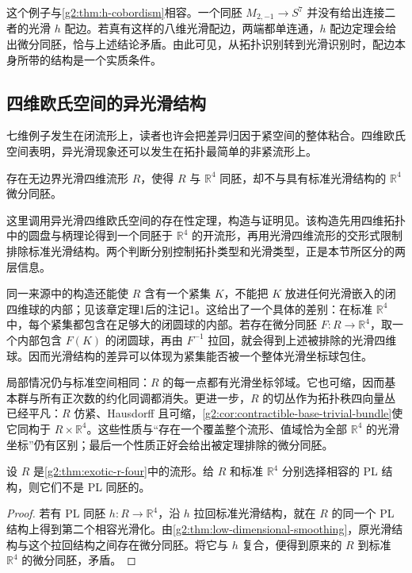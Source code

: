 \ProseParagraphBreak

这个例子与\cref{g2:thm:h-cobordism}相容。一个同胚 \(M_{2,-1}\rightarrow S^7\) 并没有给出连接二者的光滑 \(h\) 配边。若真有这样的八维光滑配边，两端都单连通，\(h\) 配边定理会给出微分同胚，恰与上述结论矛盾。由此可见，从拓扑识别转到光滑识别时，配边本身所带的结构是一个实质条件。

\subsection{四维欧氏空间的异光滑结构}
\label{g2:subsec:2304:04}
七维例子发生在闭流形上，读者也许会把差异归因于紧空间的整体粘合。四维欧氏空间表明，异光滑现象还可以发生在拓扑最简单的非紧流形上。

\begin{theorem}\label{g2:thm:exotic-r-four}
	存在无边界光滑四维流形 \(R\)，使得 \(R\) 与 \(\mathbb R^4\) 同胚，却不与具有标准光滑结构的 \(\mathbb R^4\) 微分同胚。
\end{theorem}

这里调用异光滑四维欧氏空间的存在性定理，构造与证明见\cite[第XIV章，定理1，第95--96页]{Kirby1989TopologyFour}。该构造先用四维拓扑中的圆盘与柄理论得到一个同胚于 \(\mathbb R^4\) 的开流形，再用光滑四维流形的交形式限制排除标准光滑结构。两个判断分别控制拓扑类型和光滑类型，正是本节所区分的两层信息。

\ProseParagraphBreak

同一来源中的构造还能使 \(R\) 含有一个紧集 \(K\)，不能把 \(K\) 放进任何光滑嵌入的闭四维球的内部；见该章定理1后的注记1。这给出了一个具体的差别：在标准 \(\mathbb R^4\) 中，每个紧集都包含在足够大的闭圆球的内部。若存在微分同胚 \(F\colon R\rightarrow\mathbb R^4\)，取一个内部包含 \(F(K)\) 的闭圆球，再由 \(F^{-1}\) 拉回，就会得到上述被排除的光滑四维球。因而光滑结构的差异可以体现为紧集能否被一个整体光滑坐标球包住。

\ProseParagraphBreak

局部情况仍与标准空间相同：\(R\) 的每一点都有光滑坐标邻域。它也可缩，因而基本群与所有正次数的约化同调都消失。更进一步，\(R\) 的切丛作为拓扑秩四向量丛已经平凡：\(R\) 仿紧、Hausdorff 且可缩，\cref{g2:cor:contractible-base-trivial-bundle}使它同构于 \(R\times\mathbb R^4\)。这些性质与“存在一个覆盖整个流形、值域恰为全部 \(\mathbb R^4\) 的光滑坐标”仍有区别；最后一个性质正好会给出被定理排除的微分同胚。

\begin{corollary}\label{g2:cor:exotic-r-four-not-pl-standard}
	设 \(R\) 是\cref{g2:thm:exotic-r-four}中的流形。给 \(R\) 和标准 \(\mathbb R^4\) 分别选择相容的 PL 结构，则它们不是 PL 同胚的。
\end{corollary}
\begin{proof}
	若有 PL 同胚 \(h\colon R\rightarrow\mathbb R^4\)，沿 \(h\) 拉回标准光滑结构，就在 \(R\) 的同一个 PL 结构上得到第二个相容光滑化。由\cref{g2:thm:low-dimensional-smoothing}，原光滑结构与这个拉回结构之间存在微分同胚。将它与 \(h\) 复合，便得到原来的 \(R\) 到标准 \(\mathbb R^4\) 的微分同胚，矛盾。
\end{proof}

